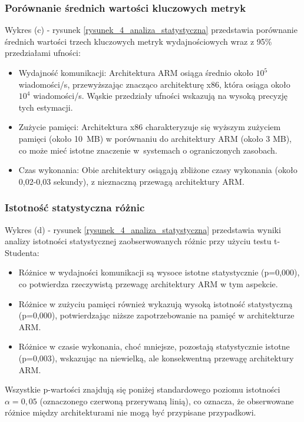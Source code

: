 \subsubsection{Porównanie średnich wartości kluczowych metryk}
Wykres (c) - rysunek \ref{rysunek_4_analiza_statystyczna} przedstawia porównanie średnich wartości trzech kluczowych metryk wydajnościowych wraz z 95\% przedziałami ufności:
\begin{itemize}
    \item Wydajność komunikacji: Architektura ARM osiąga średnio około $10^5$ wiadomości/s, przewyższając znacząco architekturę x86, która osiąga około $10^4$ wiadomości/s. Wąskie przedziały ufności wskazują na wysoką precyzję tych estymacji.
    \item Zużycie pamięci: Architektura x86 charakteryzuje się wyższym zużyciem pamięci (około \mbox{10 MB}) w porównaniu do architektury ARM (około 3 MB), co może mieć istotne znaczenie w~systemach o ograniczonych zasobach.
    \item Czas wykonania: Obie architektury osiągają zbliżone czasy wykonania (około 0,02-0,03 sekundy), z nieznaczną przewagą architektury ARM.
\end{itemize}

\subsubsection{Istotność statystyczna różnic}
Wykres (d) - rysunek \ref{rysunek_4_analiza_statystyczna} przedstawia wyniki analizy istotności statystycznej zaobserwowanych różnic przy użyciu testu t-Studenta:
\begin{itemize}
    \item Różnice w wydajności komunikacji są wysoce istotne statystycznie (p=0,000), co potwierdza rzeczywistą przewagę architektury ARM w tym aspekcie.
    \item Różnice w zużyciu pamięci również wykazują wysoką istotność statystyczną (p=0,000), potwierdzając niższe zapotrzebowanie na pamięć w architekturze ARM.
    \item Różnice w czasie wykonania, choć mniejsze, pozostają statystycznie istotne (p=0,003), wskazując na niewielką, ale konsekwentną przewagę architektury ARM.
\end{itemize}

Wszystkie p-wartości znajdują się poniżej standardowego poziomu istotności $\alpha=0,05$ (oznaczonego czerwoną przerywaną linią), co oznacza, że obserwowane różnice między architekturami nie mogą być przypisane przypadkowi.
